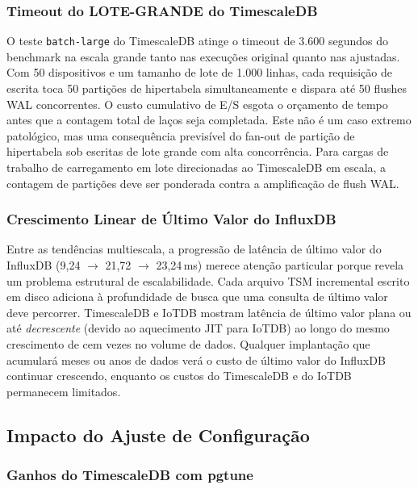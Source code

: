 \subsubsection{Timeout do LOTE-GRANDE do TimescaleDB}

O teste \texttt{batch-large} do TimescaleDB atinge o timeout de 3.600 segundos do benchmark
na escala grande tanto nas execuções original quanto nas ajustadas. Com 50 dispositivos e um
tamanho de lote de 1.000 linhas, cada requisição de escrita toca 50 partições de hipertabela
simultaneamente e dispara até 50 flushes WAL concorrentes. O custo cumulativo de E/S esgota
o orçamento de tempo antes que a contagem total de laços seja completada. Este não é um caso
extremo patológico, mas uma consequência previsível do fan-out de partição de hipertabela sob
escritas de lote grande com alta concorrência. Para cargas de trabalho de carregamento em lote
direcionadas ao TimescaleDB em escala, a contagem de partições deve ser ponderada contra a
amplificação de flush WAL.

\subsubsection{Crescimento Linear de Último Valor do InfluxDB}

Entre as tendências multiescala, a progressão de latência de último valor do InfluxDB
(9,24 $\to$ 21,72 $\to$ 23,24\,ms) merece atenção particular porque revela um problema
estrutural de escalabilidade. Cada arquivo TSM incremental escrito em disco adiciona à
profundidade de busca que uma consulta de último valor deve percorrer. TimescaleDB e IoTDB
mostram latência de último valor plana ou até \textit{decrescente} (devido ao aquecimento JIT
para IoTDB) ao longo do mesmo crescimento de cem vezes no volume de dados. Qualquer implantação que
acumulará meses ou anos de dados verá o custo de último valor do InfluxDB continuar crescendo,
enquanto os custos do TimescaleDB e do IoTDB permanecem limitados.

\subsection{Impacto do Ajuste de Configuração}
\label{sec:tuning-results}

\subsubsection{Ganhos do TimescaleDB com pgtune}


